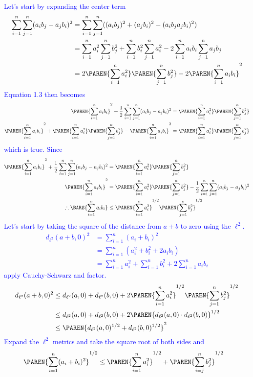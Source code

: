\documentclass[10pt,a4paper]{report}
\newcommand{\BLUE}[1]{\textcolor{blue}{#1}}
\begin{document}
\begin{enumerate}[label=\Roman*.]
\begin{description}
\BLUE{Let's start by expanding the center term\begin{align*}
	\sum_{i=1}^n\sum_{j=1}^n(a_ib_j-a_jb_i)^2 &= \sum_{i=1}^n\sum_{j=1}^n ( (a_ib_j)^2+(a_jb_i)^2 -(a_ib_ja_jb_i)^2)\\
	&= \sum_{i=1}^n a_i^2\sum_{j=1}^n b_j^2 + \sum_{i=1}^nb_i^2\sum_{j=1}^n a_i^2 - 2\sum_{i=1}^na_ib_i\sum_{j=1}^na_jb_j \\
	&= 2\PAREN{\sum_{i=1}^na_i^2}\PAREN{\sum_{j=1}^nb_j^2}-2\PAREN{\sum_{i=1}^na_ib_i}^2
\end{align*}Equation 1.3 then becomes
\begin{align*}
	\PAREN{\sum_{i=1}^na_ib_i}^2+\frac{1}{2}\sum_{i=1}^n\sum_{j=1}^n(a_ib_j-a_jb_i)^2= \PAREN{\sum_{i=1}^na_i^2}\PAREN{\sum_{j=1}^n b_j^2} \\
	\PAREN{\sum_{i=1}^na_ib_i}^2+\PAREN{\sum_{i=1}^na_i^2}\PAREN{\sum_{j=1}^nb_j^2}-\PAREN{\sum_{i=1}^na_ib_i}^2= \PAREN{\sum_{i=1}^na_i^2}\PAREN{\sum_{j=1}^n b_j^2}
\end{align*}which is true.  Since
\begin{align*}
	\PAREN{\sum_{i=1}^na_ib_i}^2+\frac{1}{2}\sum_{i=1}^n\sum_{j=1}^n(a_ib_j-a_jb_i)^2&= \PAREN{\sum_{i=1}^na_i^2}\PAREN{\sum_{j=1}^n b_j^2} \\
	\PAREN{\sum_{i=1}^na_ib_i}^2&=\PAREN{\sum_{i=1}^na_i^2}\PAREN{\sum_{j=1}^n b_j^2} - \frac{1}{2}\sum_{i=1}^n\sum_{j=1}^n(a_ib_j-a_jb_i)^2 \\
	\therefore \BARS{\sum_{i=1}^na_ib_i} &\le \PAREN{\sum_{i=1}^na_i^2}^{1/2}\PAREN{\sum_{j=1}^n b_j^2}^{1/2}
\end{align*}Let's start by taking the square of the distance from $a+b$ to zero using the $\ell^2$.
\begin{align*}
	d_{\ell^2}(a+b, 0)^2 &= \sum_{i=1}^n (a_i+b_i)^2 \\
	&= \sum_{i=1}^n (a_i^2 + b_i^2 + 2a_ib_i) \\
	&= \sum_{i=1}^n a_i^2 + \sum_{i=1}^nb_i^2 + 2\sum_{i=1}^na_ib_i 
\end{align*}apply Cauchy-Schwarz and factor.
\begin{align*}
	d_{\ell^2}(a+b, 0)^2 &\le d_{\ell^2}(a,0) + d_{\ell^2}(b, 0) + 2 \PAREN{\sum_{i=1}^na_i^2}^{1/2}\PAREN{\sum_{j=1}^n b_j^2}^{1/2} \\
	&\le d_{\ell^2}(a,0) + d_{\ell^2}(b, 0) + 2\PAREN{ d_{\ell^2}(a,0)\cdot d_{\ell^2}(b,0) }^{1/2} \\
	&\le \PAREN{ d_{\ell^2}(a,0)^{1/2} + d_{\ell^2}(b,0)^{1/2}}^2
\end{align*}Expand the $\ell^2$ metrics and take the square root of both sides and 
\begin{align*}
	\PAREN{\sum_{i=1}^n(a_i+b_i)^2}^{1/2} &\le \PAREN{\sum_{i=1}^n a_i^2}^{1/2}+\PAREN{\sum_{i=j}^n b_j^2}^{1/2}
\end{align*} }


\end{description}
\end{enumerate}
\end{document}
